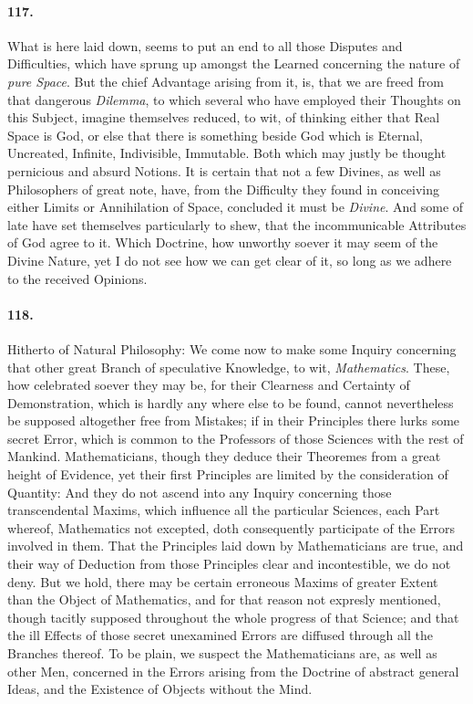 \documentclass[]{article}
\newenvironment{sectionbody}{}{}
\begin{document}
\begin{sectionbody}
\paragraph{117.} What is here laid down, seems to put an end to all those Disputes
and Difficulties, which have sprung up amongst the Learned
concerning the nature of \emph{pure Space}.  But the chief
Advantage arising from it, is, that we are freed from that
dangerous \emph{Dilemma}, to which several who have employed
their Thoughts on this Subject, imagine themselves reduced, to
wit, of thinking either that Real Space is {\sc God}, or else that
there is something beside {\sc God} which is Eternal, Uncreated,
Infinite, Indivisible, Immutable.  Both which may justly be
thought pernicious and absurd Notions.  It is certain that not a
few Divines, as well as Philosophers of great note, have, from
the Difficulty they found in conceiving either Limits or
Annihilation of Space, concluded it must be \emph{Divine}.  And
some of late have set themselves particularly to shew, that the
incommunicable Attributes of {\sc God} agree to it.  Which Doctrine,
how unworthy soever it may seem of the Divine Nature, yet I do
not see how we can get clear of it, so long as we adhere to the
received Opinions.



\paragraph{118.} Hitherto of Natural Philosophy: We come now to make some Inquiry
concerning that other great Branch of speculative Knowledge, to
wit, \emph{Mathematics}.  These, how celebrated soever they may
be, for their Clearness and Certainty of Demonstration, which is
hardly any where else to be found, cannot nevertheless be
supposed altogether free from Mistakes; if in their Principles
there lurks some secret Error, which is common to the Professors
of those Sciences with the rest of Mankind.  Mathematicians,
though they deduce their Theoremes from a great height of
Evidence, yet their first Principles are limited by the
consideration of Quantity: And they do not ascend into any
Inquiry concerning those transcendental Maxims, which influence
all the particular Sciences, each Part whereof, Mathematics not
excepted, doth consequently participate of the Errors involved in
them.  That the Principles laid down by Mathematicians are true,
and their way of Deduction from those Principles clear and
incontestible, we do not deny.  But we hold, there may be certain
erroneous Maxims of greater Extent than the Object of
Mathematics, and for that reason not expresly mentioned, though
tacitly supposed throughout the whole progress of that Science;
and that the ill Effects of those secret unexamined Errors are
diffused through all the Branches thereof.  To be plain, we
suspect the Mathematicians are, as well as other Men, concerned
in the Errors arising from the Doctrine of abstract general
Ideas, and the Existence of Objects without the Mind.




\end{sectionbody}
\end{document}
